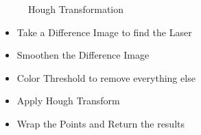 \begin{figure}[h!]
\centering
{} \quad
{} \hfill
\caption{Hough Transformation}
\end{figure}




\begin{itemize}
	\item Take a Difference Image to find the Laser
  \item Smoothen the Difference Image
  \item Color Threshold to remove everything else
  \item Apply Hough Transform
  \item Wrap the Points and Return the results
\end{itemize}